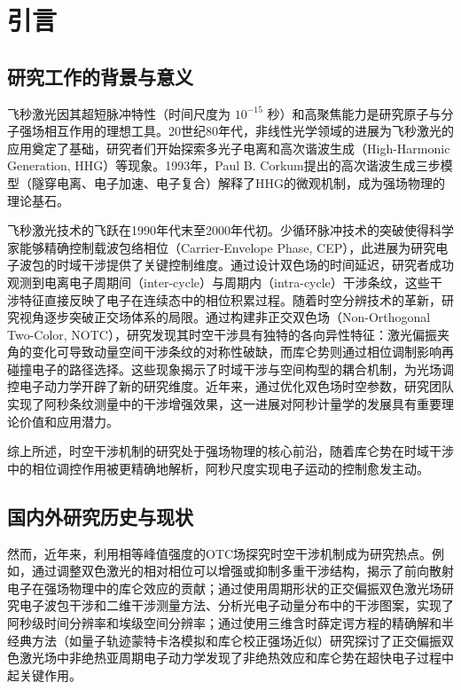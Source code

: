 
\chapter{引\hspace{6pt}言}

\section{研究工作的背景与意义}
飞秒激光因其超短脉冲特性（时间尺度为 $10^{-15}$ 秒）和高聚焦能力是研究原子与分子强场相互作用的理想工具。20世纪80年代，非线性光学领域的进展为飞秒激光的应用奠定了基础，研究者们开始探索多光子电离和高次谐波生成（High-Harmonic Generation, HHG）等现象。1993年，Paul B. Corkum提出的高次谐波生成三步模型（隧穿电离、电子加速、电子复合）解释了HHG的微观机制，成为强场物理的理论基石。

飞秒激光技术的飞跃在1990年代末至2000年代初。少循环脉冲技术的突破使得科学家能够精确控制载波包络相位（Carrier-Envelope Phase, CEP），此进展为研究电子波包的时域干涉提供了关键控制维度。通过设计双色场的时间延迟，研究者成功观测到电离电子周期间（inter-cycle）与周期内（intra-cycle）干涉条纹，这些干涉特征直接反映了电子在连续态中的相位积累过程。随着时空分辨技术的革新，研究视角逐步突破正交场体系的局限。通过构建非正交双色场（Non-Orthogonal Two-Color, NOTC），研究发现其时空干涉具有独特的各向异性特征：激光偏振夹角的变化可导致动量空间干涉条纹的对称性破缺，而库仑势则通过相位调制影响再碰撞电子的路径选择。这些现象揭示了时域干涉与空间构型的耦合机制，为光场调控电子动力学开辟了新的研究维度。近年来，通过优化双色场时空参数，研究团队实现了阿秒条纹测量中的干涉增强效果，这一进展对阿秒计量学的发展具有重要理论价值和应用潜力。

综上所述，时空干涉机制的研究处于强场物理的核心前沿，随着库仑势在时域干涉中的相位调控作用被更精确地解析，阿秒尺度实现电子运动的控制愈发主动。

\section{国内外研究历史与现状}
然而，近年来，利用相等峰值强度的OTC场探究时空干涉机制成为研究热点。例如，通过调整双色激光的相对相位可以增强或抑制多重干涉结构，揭示了前向散射电子在强场物理中的库仑效应的贡献；通过使用周期形状的正交偏振双色激光场研究电子波包干涉和二维干涉测量方法、分析光电子动量分布中的干涉图案，实现了阿秒级时间分辨率和埃级空间分辨率；通过使用三维含时薛定谔方程的精确解和半经典方法（如量子轨迹蒙特卡洛模拟和库仑校正强场近似）研究探讨了正交偏振双色激光场中非绝热亚周期电子动力学发现了非绝热效应和库仑势在超快电子过程中起关键作用。

